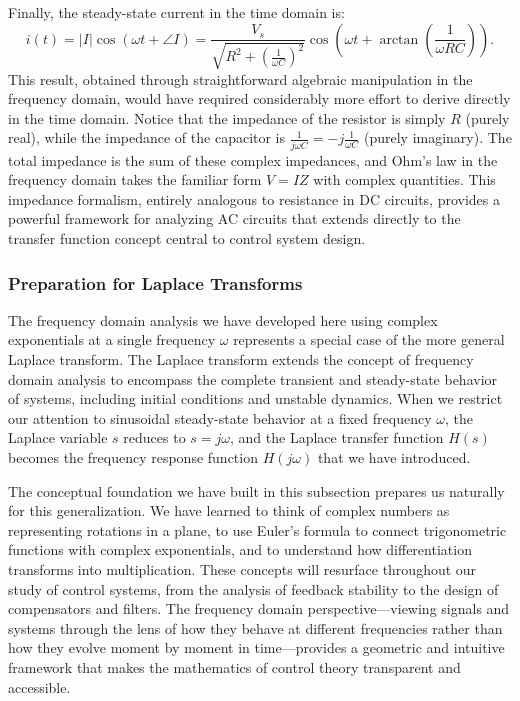 Finally, the steady-state current in the time domain is:
\begin{equation}
i(t) = |I|\cos(\omega t + \angle I) = \frac{V_s}{\sqrt{R^2 + \left(\frac{1}{\omega C}\right)^2}}\cos\left(\omega t + \arctan\left(\frac{1}{\omega RC}\right)\right).
\end{equation}
This result, obtained through straightforward algebraic manipulation in the frequency domain, would have required considerably more effort to derive directly in the time domain. Notice that the impedance of the resistor is simply $R$ (purely real), while the impedance of the capacitor is $\frac{1}{j\omega C} = -j\frac{1}{\omega C}$ (purely imaginary). The total impedance is the sum of these complex impedances, and Ohm's law in the frequency domain takes the familiar form $V = IZ$ with complex quantities. This impedance formalism, entirely analogous to resistance in DC circuits, provides a powerful framework for analyzing AC circuits that extends directly to the transfer function concept central to control system design.

\subsubsection{Preparation for Laplace Transforms}

The frequency domain analysis we have developed here using complex exponentials at a single frequency $\omega$ represents a special case of the more general Laplace transform. The Laplace transform extends the concept of frequency domain analysis to encompass the complete transient and steady-state behavior of systems, including initial conditions and unstable dynamics. When we restrict our attention to sinusoidal steady-state behavior at a fixed frequency $\omega$, the Laplace variable $s$ reduces to $s = j\omega$, and the Laplace transfer function $H(s)$ becomes the frequency response function $H(j\omega)$ that we have introduced.

The conceptual foundation we have built in this subsection prepares us naturally for this generalization. We have learned to think of complex numbers as representing rotations in a plane, to use Euler's formula to connect trigonometric functions with complex exponentials, and to understand how differentiation transforms into multiplication. These concepts will resurface throughout our study of control systems, from the analysis of feedback stability to the design of compensators and filters. The frequency domain perspective—viewing signals and systems through the lens of how they behave at different frequencies rather than how they evolve moment by moment in time—provides a geometric and intuitive framework that makes the mathematics of control theory transparent and accessible.

